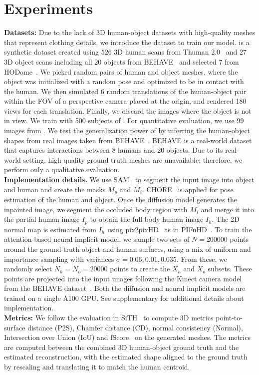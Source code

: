 \section{Experiments}
\label{sec:experiments}
\textbf{Datasets:} Due to the lack of 3D human-object datasets with high-quality meshes that represent clothing details, we introduce the dataset \dataname to train our model. \dataname is a synthetic dataset created using $526$ 3D human scans from Thuman 2.0~\cite{yu2021function4d} and $27$ 3D object scans including all 20 objects from BEHAVE~\cite{bhatnagar2022behave} and selected 7 from HODome~\cite{zhang2023neuraldome}. We picked random pairs of human and object meshes, where the object was initialized with a random pose and optimized to be in contact with the human. We then simulated 6 random translations of the human-object pair within the FOV of a perspective camera placed at the origin, and rendered 180 views for each translation. Finally, we discard the images where the object is not in view.  We train \name with 500 subjects of \dataname. For quantitative evaluation, we use 99 images from \dataname. We test the generalization power of \name by inferring the human-object shapes from real images taken from BEHAVE~\cite{bhatnagar2022behave}. BEHAVE is a real-world dataset that captures interactions between 8 humans and 20 objects. Due to its real-world setting, high-quality ground truth meshes are unavailable; therefore, we perform only a qualitative evaluation.
\\\textbf{Implementation details.} We use SAM~\cite{kirillov2023segment} to segment the input image into object and human and create the masks $M_p$ and $M_i$. CHORE~\cite{xie2022chore} is applied for pose estimation of the human and object. Once the diffusion model generates the inpainted image, we segment the occluded body region with $M_i$ and merge it into the partial human image $I_p$ to obtain the full-body human image $I_h$. The 2D normal map is estimated from $I_h$  using pix2pixHD~\cite{wang2018high} as in PIFuHD~\cite{pifuhd}.
To train the attention-based neural implicit model, we sample two sets of $N=200000$ points around the ground-truth object and human surfaces, using a mix of uniform and importance sampling with variances $\sigma=0.06, 0.01, 0.035$. From these, we randomly select $N_h=N_o=20000$ points to create the $X_h$ and $X_o$ subsets. These points are projected into the input images following the Kinect camera model from the BEHAVE dataset~\cite{bhatnagar2022behave}. Both the diffusion and neural implicit models are trained on a single A100 GPU.
See supplementary for additional details about implementation.
\\\textbf{Metrics:} We follow the evaluation
in SiTH~\cite{ho2024sith} to compute 3D metrics point-to-surface distance (P2S),
Chamfer distance (CD), normal consistency (Normal), Intersection over Union (IoU) and fScore~\cite{tatarchenko2019single} on the generated meshes. The metrics are computed between the combined 3D human-object ground truth and the estimated reconstruction, with the estimated shape aligned to the ground truth by rescaling and translating it to match the human centroid.
